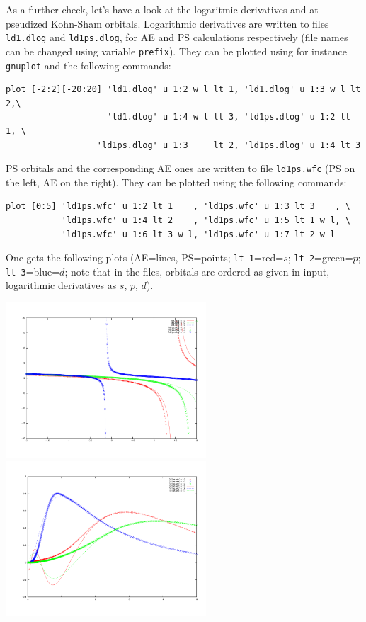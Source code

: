 \documentclass[12pt,a4paper]{article}
\begin{document}
As a further check, let's have a look at the logaritmic derivatives
and at pseudized Kohn-Sham orbitals. Logarithmic derivatives are written 
to files \texttt{ld1.dlog} and \texttt{ld1ps.dlog}, for AE and PS 
calculations respectively (file names can be changed using variable 
\texttt{prefix}). They can be plotted using for instance 
\texttt{gnuplot} and the following commands:
\begin{verbatim}
plot [-2:2][-20:20] 'ld1.dlog' u 1:2 w l lt 1, 'ld1.dlog' u 1:3 w l lt 2,\
                    'ld1.dlog' u 1:4 w l lt 3, 'ld1ps.dlog' u 1:2 lt 1, \
                  'ld1ps.dlog' u 1:3     lt 2, 'ld1ps.dlog' u 1:4 lt 3
\end{verbatim}
PS orbitals and the corresponding AE ones are written to file 
\texttt{ld1ps.wfc} (PS on the left, AE on the right). They can be 
plotted using the following commands:
\begin{verbatim}
plot [0:5] 'ld1ps.wfc' u 1:2 lt 1    , 'ld1ps.wfc' u 1:3 lt 3    , \
           'ld1ps.wfc' u 1:4 lt 2    , 'ld1ps.wfc' u 1:5 lt 1 w l, \
           'ld1ps.wfc' u 1:6 lt 3 w l, 'ld1ps.wfc' u 1:7 lt 2 w l
\end{verbatim}
One gets the following plots (AE=lines, PS=points; 
\texttt{lt 1}=red=$s$; \texttt{lt 2}=green=$p$; \texttt{lt 3}=blue=$d$; 
note that in the files, orbitals are ordered as given in input, 
logarithmic derivatives as $s$, $p$, $d$).

\includegraphics[width=7.5cm]{pseudo-gen-fig1.pdf}
\includegraphics[width=7.5cm]{pseudo-gen-fig2.pdf}
\end{document}
